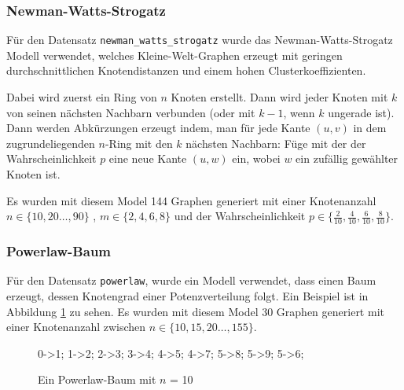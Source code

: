 \documentclass[12pt,a4paper,onecolumn,oneside,titlepage]{article}
\newcommand{\vars}{\texttt}
\begin{document}
\subsubsection{Newman-Watts-Strogatz}
Für den Datensatz \vars{newman\_watts\_strogatz} wurde das Newman-Watts-Strogatz Modell verwendet\cite{Newman99}, welches Kleine-Welt-Graphen erzeugt mit geringen durchschnittlichen Knotendistanzen und einem hohen Clusterkoeffizienten.

Dabei wird zuerst ein Ring von $n$ Knoten erstellt. Dann wird jeder Knoten mit $k$ von seinen nächsten Nachbarn verbunden (oder mit $k-1$, wenn $k$ ungerade ist).
Dann werden Abkürzungen erzeugt indem, man für jede Kante $(u,v)$ in dem zugrundeliegenden $n$-Ring mit den $k$ nächsten Nachbarn: Füge mit der der Wahrscheinlichkeit $p$ eine neue Kante $(u,w)$ ein, wobei $w$ ein zufällig gewählter Knoten ist.

Es wurden mit diesem Model 144 Graphen generiert mit einer Knotenanzahl $n \in \{10,20…,90\}$  , $m \in \{2,4,6,8\}$ und der Wahrscheinlichkeit $p \in \{\frac{2}{10},\frac{4}{10},\frac{6}{10},\frac{8}{10}\}$.
\subsubsection{Powerlaw-Baum}
Für den Datensatz \vars{powerlaw}, wurde ein Modell verwendet, dass einen Baum erzeugt, dessen Knotengrad einer Potenzverteilung folgt. Ein Beispiel ist in Abbildung \ref{fig:powerlaw-tree} zu sehen.
Es wurden mit diesem Model 30 Graphen generiert mit einer Knotenanzahl zwischen $n \in \{10,15,20…,155\}$.
\begin{figure}
{
 0->1;
1->2;
2->3;
3->4;
4->5;
4->7;
5->8;
5->9;
5->6;
}
\caption{Ein Powerlaw-Baum mit $n$ = 10}
\label{fig:powerlaw-tree}
\end{figure}
\end{document}
